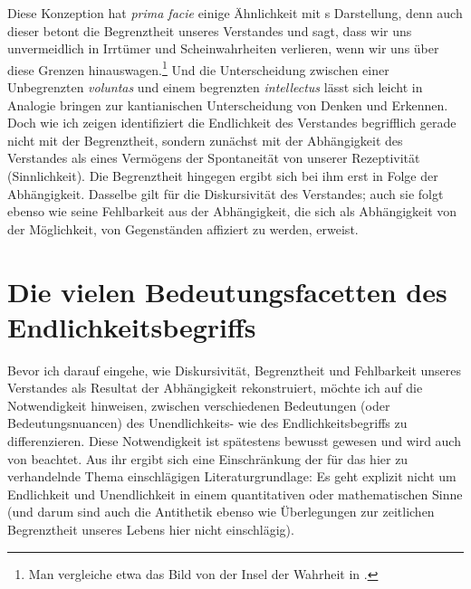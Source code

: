 Diese Konzeption hat \emph{prima facie} einige Ähnlichkeit mit
s Darstellung, denn auch dieser betont die Begrenztheit
unseres Verstandes und sagt, dass wir uns unvermeidlich in Irrtümer und
Scheinwahrheiten verlieren, wenn wir uns über diese Grenzen
hinauswagen.\footnote{Man vergleiche etwa das Bild von der Insel der Wahrheit
in \cite[][B 294\,f.,]{Kant:KritikderreinenVernunft2003}
\cite[][III: 202.12--203.3]{Kant:GesammelteWerke1900ff.}.}
Und die Unterscheidung zwischen einer Unbegrenzten \emph{voluntas} und einem
begrenzten \emph{intellectus} lässt sich leicht in Analogie bringen zur
kantianischen Unterscheidung von Denken und Erkennen. Doch
wie ich zeigen identifiziert  die Endlichkeit des
Verstandes begrifflich gerade nicht mit
der Begrenztheit, sondern zunächst mit der Abhängigkeit des
Verstandes als eines Vermögens der Spontaneität von unserer Rezeptivität
(Sinnlichkeit). 
\label{Abschnitt:VertrauteBestimmungenergebensichausGrundbestimmungunsererEndlichkeit}
Die Begrenztheit hingegen ergibt sich bei ihm erst in Folge der Abhängigkeit.
Dasselbe gilt für die Diskursivität des Verstandes; auch sie folgt ebenso wie
seine Fehlbarkeit aus der Abhängigkeit, die sich als Abhängigkeit von der
Möglichkeit, von Gegenständen affiziert zu werden, erweist.

\section{Die vielen Bedeutungsfacetten des
Endlichkeitsbegriffs}\label{subsection:DievielenFacettendesEndlichkeitsbegriffs}
Bevor ich darauf eingehe, wie  Diskursivität, Begrenztheit
und Fehlbarkeit unseres Verstandes als Resultat der
Abhängigkeit rekonstruiert, möchte ich auf die Notwendigkeit hinweisen, zwischen
verschiedenen Bedeutungen (oder Bedeutungsnuancen) des Unendlichkeits- wie des
Endlichkeitsbegriffs zu differenzieren. Diese Notwendigkeit
ist spätestens 
bewusst gewesen und wird auch von  beachtet. Aus ihr ergibt
sich eine Einschränkung der für das hier zu verhandelnde Thema einschlägigen
Literaturgrundlage: Es geht explizit nicht um Endlichkeit und Unendlichkeit
in einem quantitativen oder mathematischen Sinne (und darum sind auch
die Antithetik ebenso wie Überlegungen zur zeitlichen Begrenztheit
unseres Lebens hier nicht einschlägig).

